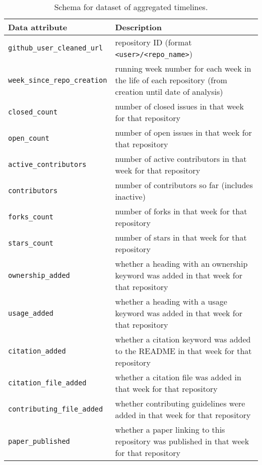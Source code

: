 \documentclass[10pt,a4paper]{scrartcl}
\begin{document}
\begin{table}
    \centering
    \begin{tabular}{|l|l|}
        \hline
        Data attribute & Description \\
        \hline
        \verb|github_user_cleaned_url| & repository ID (format \verb|<user>/<repo_name>|) \\
        \verb|week_since_repo_creation| & running week number for each week in the life of each repository (from creation until date of analysis) \\
        \verb|closed_count| & number of closed issues in that week for that repository \\
        \verb|open_count| & number of open issues in that week for that repository \\
        \verb|active_contributors| & number of active contributors in that week for that repository \\
        \verb|contributors| & number of contributors so far (includes inactive) \\
        \verb|forks_count| & number of forks in that week for that repository \\
        \verb|stars_count| & number of stars in that week for that repository \\
        \verb|ownership_added| & whether a heading with an ownership keyword was added in that week for that repository \\
        \verb|usage_added| & whether a heading with a usage keyword was added in that week for that repository \\
        \verb|citation_added| & whether a citation keyword was added to the README in that week for that repository \\
        \verb|citation_file_added| & whether a citation file was added in that week for that repository\\
        \verb|contributing_file_added| & whether contributing guidelines were added in that week for that repository \\
        \verb|paper_published| & whether a paper linking to this repository was published in that week for that repository \\
        \hline
    \end{tabular}
    \caption{Schema for dataset of aggregated timelines.}
    \label{table:schema_agg_timelines}
\end{table}
\end{document}
